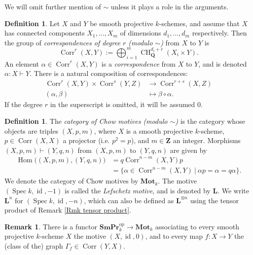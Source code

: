 \documentclass[11pt]{amsart}
\theoremstyle{definition}
\newtheorem{Rmk}[Thm]{Remark}
\newtheorem{Def}[Thm]{Definition}
\renewcommand{\L}{\mathbf L}
\newcommand{\Z}{\mathbf Z}
\newcommand{\Q}{\mathbf Q}
\newcommand{\Hom}{\operatorname{Hom}}
\newcommand{\Spec}{\operatorname{Spec}}
\newcommand{\CH}{\operatorname{CH}}
\newcommand{\op}{^{\operatorname{op}}}
\newcommand{\id}{\operatorname{id}}
\newcommand{\Corr}{\operatorname{Corr}}
\newcommand{\cto}{\vdash}
\newcommand{\SmPr}{\mathbf{SmPr}}
\newcommand{\M}{\mathbf{Mot}}
\begin{document}
We will omit further mention of $\sim$ unless it plays a role in the
arguments.

\begin{Def}\label{Def correspondences}
Let $X$ and $Y$ be smooth projective $k$-schemes, and assume that
$X$ has connected components $X_1, \ldots, X_m$ of dimensions $d_1,
\ldots, d_m$ respectively. Then the group of \emph{correspondences
of degree $r$ (modulo $\sim$)} from $X$ to $Y$ is
\[
\Corr^r(X,Y) := \bigoplus_{i=1}^m \CH^{d_i+r}_\Q(X_i \times Y).
\]
An element $\alpha \in \Corr^r(X,Y)$ is a \emph{correspondence} from
$X$ to $Y$, and is denoted
$\alpha \colon X \cto Y$.
%
There is a natural composition of correspondences:
\begin{align*}
\Corr^r(X,Y) \times \Corr^s(Y,Z) &\to \Corr^{r+s}(X,Z)\\
(\alpha, \beta) &\mapsto \beta \circ \alpha.
\end{align*}
If the degree $r$ in the superscript is omitted, it will be assumed
$0$.
\end{Def}

\begin{Def}\label{Def Chow motive}
The \emph{category of Chow motives (modulo $\sim$)} is the category
whose objects are triples $(X,p,m)$, where $X$ is a smooth
projective $k$-scheme, $p \in \Corr(X,X)$ a projector (i.e. $p^2 =
p$), and $m \in \Z$ an integer. Morphisms $(X,p,m) \cto (Y,q,n)$
from $(X,p,m)$ to $(Y,q,n)$ are given by
\begin{align*}
\Hom\big((X,p,m),(Y,q,n)\big) &= q\Corr^{n-m}(X,Y)p\\
&= \{\alpha \in \Corr^{n-m}(X,Y)\ |\ \alpha p = \alpha = q \alpha\}.
\end{align*}
We denote the category of Chow motives by $\M_k$. The motive $(\Spec
k,\id,-1)$ is called the \emph{Lefschetz motive}, and is denoted by
$\L$. We write $\L^n$ for $(\Spec k,\id,-n)$, which can also be
defined as $\L^{\otimes n}$ using the tensor product of Remark
\ref{Rmk tensor product}.
\end{Def}

\begin{Rmk}\label{Rmk motives contravariant}
There is a functor $\SmPr_k\op \to \M_k$ associating to every smooth
projective $k$-scheme $X$ the motive $(X,\id,0)$, and to every map
$f \colon X \to Y$ the (class of the) graph $\Gamma_f \in
\Corr(Y,X)$.
\end{Rmk}
\end{document}
